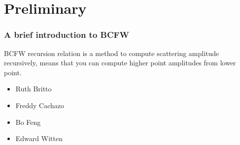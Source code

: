 \documentclass{beamer}
\begin{document}
\section{Preliminary}
\begin{frame}
    \frametitle{A brief introduction to BCFW}
    BCFW recursion relation is a method to compute scattering amplitude recursively, means that you can 
    compute higher point amplitudes from lower point.
    \par
 \begin{itemize}[label=\textbullet]
    \item Ruth Britto
    \item Freddy Cachazo
    \item Bo Feng
    \item Edward Witten
 \end{itemize}
 


\begin{center}
    

 \begin{tikzpicture}[x=0.75pt,y=0.75pt,yscale=-1,xscale=1]
 

\end{tikzpicture}
\end{center}
\end{frame}
\end{document}
